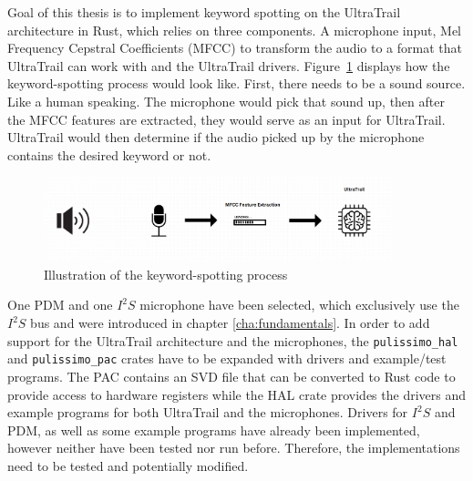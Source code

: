 
Goal of this thesis is to implement keyword spotting on the UltraTrail architecture in Rust,
which relies on three components.
A microphone input, Mel Frequency Cepstral Coefficients (MFCC) \cite[Cha 2.5]{rust_pulp} to transform the audio to
a format that UltraTrail can work with and the UltraTrail drivers.
Figure~\ref{fig:pipeline} displays how the keyword-spotting process would look like.
First, there needs to be a sound source. Like a human speaking.
The microphone would pick that sound up, then after the MFCC features are extracted, they would serve
as an input for UltraTrail. UltraTrail would then determine if the audio picked up by the microphone
contains the desired keyword or not.

\begin{figure}[H]
    \centering
    \includegraphics[width=0.9\textwidth]{figures/pipeline.png}
    \caption[Illustration of the keyword-spotting process]{Illustration of the keyword-spotting process}
    \label{fig:pipeline}
\end{figure}

One PDM and one $I^2S$ microphone have been selected, which exclusively use the $I^2S$ bus and were introduced
in chapter \ref{cha:fundamentals}.
In order to add support for the UltraTrail architecture and the microphones, the \lstinline{pulissimo_hal}
and \lstinline{pulissimo_pac} crates have to be expanded with drivers and example/test programs.
The PAC contains an SVD file that can be converted to Rust code to provide access to hardware registers
while the HAL crate provides the drivers and example programs for both UltraTrail and the microphones.
Drivers for $I^2S$ and PDM, as well as some example programs have already been implemented,
however neither have been tested nor run before.
Therefore, the implementations need to be tested and potentially modified.


